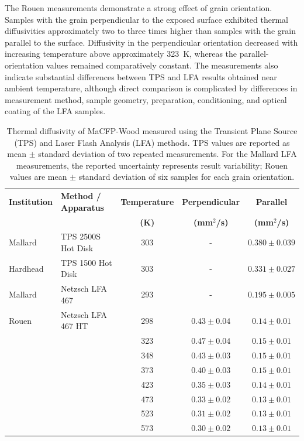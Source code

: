 \documentclass{book}
\begin{document}
The Rouen measurements demonstrate a strong effect of grain orientation. Samples with the grain perpendicular to the exposed surface exhibited thermal diffusivities approximately two to three times higher than samples with the grain parallel to the surface. Diffusivity in the perpendicular orientation decreased with increasing temperature above approximately 323~K, whereas the parallel-orientation values remained comparatively constant. The measurements also indicate substantial differences between TPS and LFA results obtained near ambient temperature, although direct comparison is complicated by differences in measurement method, sample geometry, preparation, conditioning, and optical coating of the LFA samples.

\begin{table}[h]
\centering
\caption{Thermal diffusivity of MaCFP-Wood measured using the Transient Plane Source (TPS) and Laser Flash Analysis (LFA) methods. TPS values are reported as mean $\pm$ standard deviation of two repeated measurements. For the Mallard LFA measurements, the reported uncertainty represents result variability; Rouen values are mean $\pm$ standard deviation of six samples for each grain orientation.}
\label{tab:Diffusivity}
\begin{tabular}{llccc}
\hline
\textbf{Institution} & \textbf{Method / Apparatus} & \textbf{Temperature} & \textbf{Perpendicular} & \textbf{Parallel} \\
& & \textbf{(K)} & \textbf{(mm$^2$/s)} & \textbf{(mm$^2$/s)} \\
\hline
Mallard & TPS 2500S Hot Disk & 303 & - & $0.380 \pm 0.039$ \\
Hardhead & TPS 1500 Hot Disk & 303 & - & $0.331 \pm 0.027$ \\
\hline
Mallard & Netzsch LFA 467 & 293 & - & $0.195 \pm 0.005$ \\
\hline
Rouen & Netzsch LFA 467 HT & 298 & $0.43 \pm 0.04$ & $0.14 \pm 0.01$ \\
& & 323 & $0.47 \pm 0.04$ & $0.15 \pm 0.01$ \\
& & 348 & $0.43 \pm 0.03$ & $0.15 \pm 0.01$ \\
& & 373 & $0.40 \pm 0.03$ & $0.15 \pm 0.01$ \\
& & 423 & $0.35 \pm 0.03$ & $0.14 \pm 0.01$ \\
& & 473 & $0.33 \pm 0.02$ & $0.13 \pm 0.01$ \\
& & 523 & $0.31 \pm 0.02$ & $0.13 \pm 0.01$ \\
& & 573 & $0.30 \pm 0.02$ & $0.13 \pm 0.01$ \\
\hline
\end{tabular}
\end{table}
\end{document}
